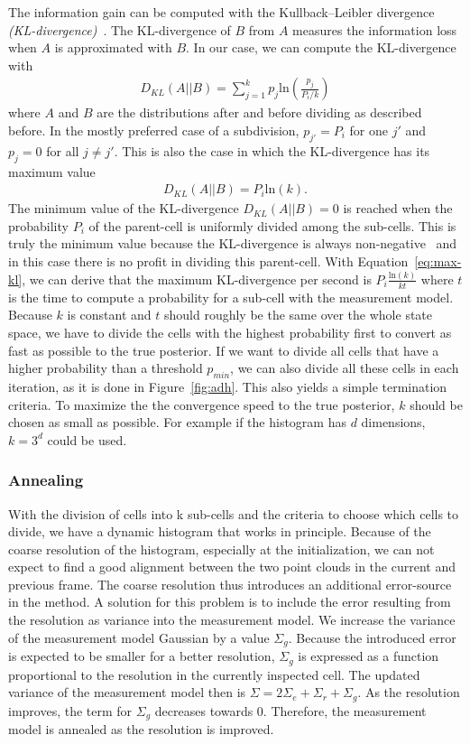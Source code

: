 \documentclass[twoside,a4paper,article]{combine}
\begin{document}
The information gain can be computed with the
Kullback–Leibler divergence \textit{(KL-divergence)}~\cite{kl-divergence}. The
KL-divergence of $B$ from $A$ measures the information loss when $A$
is approximated with $B$. In our case, we can compute the
KL-divergence with
\begin{align}
  D_{KL}(A||B)=\sum_{j=1}^k p_j \mathrm{ln}\left(\frac{p_j}{P_i/k}\right)
\end{align}
where $A$ and $B$ are the distributions after and before dividing as
described before. In the mostly preferred case of a subdivision,
$p_{j'}=P_i$ for one $j'$ and $p_j=0$ for all $j\neq j'$. This is also
the case in which the KL-divergence has its maximum value
\begin{align}
  D_{KL}(A||B)=P_i \mathrm{ln}(k) \mathrm{ . }
  \label{eq:max-kl}
\end{align}
The minimum value of the KL-divergence $D_{KL}(A||B)=0$ is reached
when the probability $P_i$ of the parent-cell is uniformly divided
among the sub-cells. This is truly the minimum value because the
KL-divergence is always non-negative~\cite{kl-divergence} and in this
case there is no profit in dividing this parent-cell. With
Equation~\ref{eq:max-kl}, we can derive that the maximum KL-divergence
per second is $P_i \frac{\mathrm{ln } (k)}{kt}$ where $t$ is the time
to compute a probability for a sub-cell with the measurement
model. Because $k$ is constant and $t$ should roughly be the same over
the whole state space, we have to divide the cells with the highest
probability first to convert as fast as possible to the true
posterior. If we want to divide all cells that have a higher
probability than a threshold $p_{min}$, we can also divide all these
cells in each iteration, as it is done in Figure~\ref{fig:adh}. This
also yields a simple termination criteria. To maximize the the
convergence speed to the true posterior, $k$ should be chosen as small
as possible. For example if the histogram has $d$ dimensions, $k=3^d$
could be used.

\subsubsection{Annealing}
\label{sub:annealing}
With the division of cells into k sub-cells and the criteria to choose
which cells to divide, we have a dynamic histogram that works in
principle. Because of the coarse resolution of the histogram,
especially at the initialization, we can not expect to find a good
alignment between the two point clouds in the current and previous
frame. The coarse resolution thus introduces an additional
error-source in the method. A solution for this problem is to include
the error resulting from the resolution as variance into the
measurement model. We increase the variance of the measurement model
Gaussian by a value $\Sigma_g$. Because the introduced error is
expected to be smaller for a better resolution, $\Sigma_g$ is
expressed as a function proportional to the resolution in the
currently inspected cell. The updated variance of the measurement
model then is $\Sigma = 2\Sigma_e+\Sigma_r+\Sigma_g$. As the
resolution improves, the term for $\Sigma_g$ decreases towards $0$.
Therefore, the
measurement model is annealed as the resolution is improved.
\end{document}
